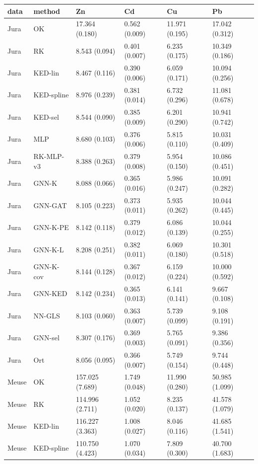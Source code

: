 \begin{tabular}{llllll}
\toprule
data & method & Zn & Cd & Cu & Pb \\
\midrule
Jura & OK & 17.364 (0.180) & 0.562 (0.009) & 11.971 (0.195) & 17.042 (0.312) \\
Jura & RK & 8.543 (0.094) & 0.401 (0.007) & 6.235 (0.175) & 10.349 (0.186) \\
Jura & KED-lin & 8.467 (0.116) & 0.390 (0.006) & 6.059 (0.171) & 10.094 (0.256) \\
Jura & KED-spline & 8.976 (0.239) & 0.381 (0.014) & 6.732 (0.296) & 11.081 (0.678) \\
Jura & KED-sel & 8.544 (0.090) & 0.385 (0.009) & 6.201 (0.290) & 10.941 (0.742) \\
Jura & MLP & 8.680 (0.103) & 0.376 (0.006) & 5.815 (0.110) & 10.031 (0.409) \\
Jura & RK-MLP-v3 & 8.388 (0.263) & 0.379 (0.008) & 5.954 (0.150) & 10.086 (0.451) \\
Jura & GNN-K & 8.088 (0.066) & 0.365 (0.016) & 5.986 (0.247) & 10.091 (0.282) \\
Jura & GNN-GAT & 8.105 (0.223) & 0.373 (0.011) & 5.935 (0.262) & 10.044 (0.445) \\
Jura & GNN-K-PE & 8.142 (0.118) & 0.379 (0.012) & 6.086 (0.139) & 10.044 (0.255) \\
Jura & GNN-K-L & 8.208 (0.251) & 0.382 (0.011) & 6.069 (0.180) & 10.301 (0.518) \\
Jura & GNN-K-cov & 8.144 (0.128) & 0.367 (0.012) & 6.159 (0.224) & 10.000 (0.592) \\
Jura & GNN-KED & 8.142 (0.234) & 0.365 (0.013) & 6.141 (0.141) & 9.667 (0.108) \\
Jura & NN-GLS & 8.103 (0.060) & 0.363 (0.007) & 5.739 (0.099) & 9.108 (0.191) \\
Jura & GNN-sel & 8.307 (0.176) & 0.369 (0.003) & 5.765 (0.091) & 9.386 (0.356) \\
Jura & Ort & 8.056 (0.095) & 0.366 (0.007) & 5.749 (0.154) & 9.744 (0.448) \\
Meuse & OK & 157.025 (7.689) & 1.749 (0.048) & 11.990 (0.280) & 50.985 (1.099) \\
Meuse & RK & 114.996 (2.711) & 1.052 (0.020) & 8.235 (0.137) & 41.578 (1.079) \\
Meuse & KED-lin & 116.227 (3.363) & 1.008 (0.027) & 8.046 (0.116) & 41.685 (1.541) \\
Meuse & KED-spline & 110.750 (4.423) & 1.070 (0.034) & 7.809 (0.300) & 40.700 (1.683) \\

\end{tabular}
